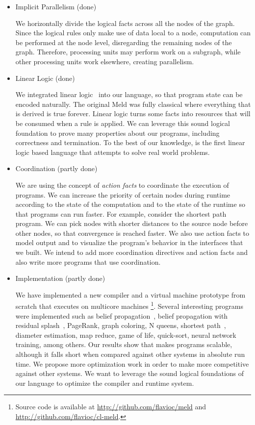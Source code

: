 \begin{itemize}
   \item Implicit Parallelism (done)
   
   We horizontally divide the logical facts across all the nodes of the graph. Since the
   logical rules only make use of data local to a node, computation can be performed at the
   node level, disregarding the remaining nodes of the graph. Therefore, processing units
   may perform work on a subgraph, while other processing units work elsewhere, creating
   parallelism.

   \item Linear Logic (done)

   We integrated linear logic~\cite{Girard95logic:its} into our language, so that program state
   can be encoded naturally. The original Meld was fully classical where everything that
   is derived is true forever. Linear logic turns some facts into resources that will be consumed when a rule is applied. We can leverage this sound logical foundation to prove many properties about our programs, including correctness and termination. To the best of our knowledge, \lang is the first
   linear logic based language that attempts to solve real world problems.

   \item Coordination (partly done)
   
   We are using the concept of \emph{action facts} to coordinate the execution of programs.
   We can increase the priority of certain nodes during runtime according to the state of the
   computation and to the state of the runtime so that programs can run faster.
   For example, consider the shortest path program. We can pick nodes with shorter
   distances to the source node before other nodes, so that convergence is reached faster.
   We also use action facts to model output and to visualize the program's behavior in the interfaces that we built. We intend to add more coordination directives and action facts and also write more
   programs that use coordination.

   \item Implementation (partly done)

   We have implemented a new compiler and a virtual machine prototype from scratch that executes on multicore machines
   \footnote{Source code is available at \url{http://github.com/flavioc/meld} and \url{http://github.com/flavioc/cl-meld}.}.
   Several interesting programs were implemented such as belief propagation~\cite{Gonzalez+al:aistats09paraml},
   belief propagation with residual splash~\cite{Gonzalez+al:aistats09paraml}, PageRank, graph coloring,
   N queens, shortest path~\cite{Dijkstra}, diameter estimation, map reduce, game of life, quick-sort, neural network training, among others. Our results show that \lang makes programs scalable, although it falls short when compared against other systems in absolute run time. We propose more optimization work
   in order to make \lang more competitive against other systems. We want to leverage the sound logical
   foundations of our language to optimize the compiler and runtime system.
   
\end{itemize}

